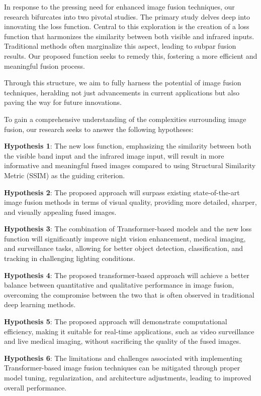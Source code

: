 In response to the pressing need for enhanced image fusion techniques, our research bifurcates into two pivotal studies. The primary study delves deep into innovating the loss function. Central to this exploration is the creation of a loss function that harmonizes the similarity between both visible and infrared inputs. Traditional methods often marginalize this aspect, leading to subpar fusion results. Our proposed function seeks to remedy this, fostering a more efficient and meaningful fusion process.

Through this structure, we aim to fully harness the potential of image fusion techniques, heralding not just advancements in current applications but also paving the way for future innovations.

To gain a comprehensive understanding of the complexities surrounding image fusion, our research seeks to answer the following hypotheses:

\begin{list}{}{}{}
    \item \textbf{Hypothesis 1}: The new loss function, emphasizing the similarity between both the visible band input and the infrared image input, will result in more informative and meaningful fused images compared to using Structural Similarity Metric (SSIM) as the guiding criterion.
    \item \textbf{Hypothesis 2}: The proposed approach will surpass existing state-of-the-art image fusion methods in terms of visual quality, providing more detailed, sharper, and visually appealing fused images.
    \item \textbf{Hypothesis 3}: The combination of Transformer-based models and the new loss function will significantly improve night vision enhancement, medical imaging, and surveillance tasks, allowing for better object detection, classification, and tracking in challenging lighting conditions.
    \item \textbf{Hypothesis 4}: The proposed transformer-based approach will achieve a better balance between quantitative and qualitative performance in image fusion, overcoming the compromise between the two that is often observed in traditional deep learning methods.
    \item \textbf{Hypothesis 5}: The proposed approach will demonstrate computational efficiency, making it suitable for real-time applications, such as video surveillance and live medical imaging, without sacrificing the quality of the fused images.
    \item \textbf{Hypothesis 6}: The limitations and challenges associated with implementing Transformer-based image fusion techniques can be mitigated through proper model tuning, regularization, and architecture adjustments, leading to improved overall performance.
\end{list}